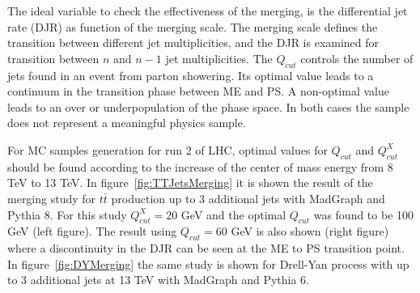 The ideal variable to check the effectiveness of the merging, is the differential jet rate (DJR) as function of the merging scale. The merging scale defines the transition between different jet multiplicities, and the DJR is examined for transition between $n$ and $n-1$ jet multiplicities. The $Q_{cut}$ controls the number of jets found in an event from parton showering. Its optimal value leads to a continuum in the transition phase between ME and PS. A non-optimal value leads to an over or underpopulation of the phase space. In both cases the sample does not represent a meaningful physics sample.

For MC samples generation for run 2 of LHC, optimal values for $Q_{cut}$ and $Q^{X}_{cut}$ should be found according to the increase of the center of mass energy from 8 TeV to 13 TeV. In figure~\ref{fig:TTJetsMerging} it is shown the result of the merging study for $t\bar{t}$ production up to 3 additional jets with MadGraph and Pythia 8. For this study $Q^{X}_{cut}=20$ GeV and the optimal $Q_{cut}$ was found to be 100 GeV (left figure). The result using $Q_{cut}=60$ GeV is also shown (right figure) where a discontinuity in the DJR can be seen at the ME to PS transition point. In figure~\ref{fig:DYMerging} the same study is shown for Drell-Yan process with up to 3 additional jets at 13 TeV with MadGraph and Pythia 6. 

